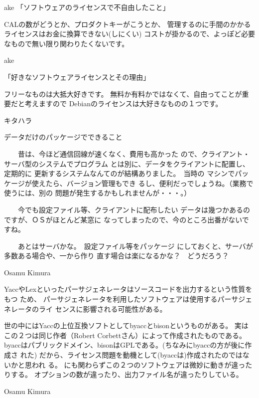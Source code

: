 \documentclass[cjk,dvipdfmx,12pt]{beamer}
\begin{document}
\begin{frame}{ake}
「ソフトウェアのライセンスで不自由したこと」

CALの数がどうとか、プロダクトキーがこうとか、
管理するのに手間のかかるライセンスはお金に換算できない(しにくい)
コストが掛かるので、よっぽど必要なもので無い限り関わりたくないです。
\end{frame}\begin{frame}{ake}

「好きなソフトウェアライセンスとその理由」

フリーなものは大抵大好きです。
無料か有料かではなくて、自由ってことが重要だと考えますので
Debianのライセンスは大好きなものの１つです。

\end{frame}\begin{frame}{キタハラ}

データだけのパッケージでできること

　　昔は、今ほど通信回線が速くなく、費用も高かった
ので、クライアント・サーバ型のシステムでプログラム
とは別に、データをクライアントに配置し、定期的に
更新するシステムなんてのが結構ありました。　当時の
マシンでパッケージが使えたら、バージョン管理もでき
るし、便利だっでしょうね。（業務で使うには、別の
問題が発生するかもしれませんが・・・。）

　　今でも設定ファイル等、クライアントに配布したい
データは幾つかあるのですが、ＯＳがほとんど某窓に
なってしまったので、今のところ出番がないですね。

　　あとはサーバかな。　設定ファイル等をパッケージ
にしておくと、サーバが多数ある場合や、一から作り
直す場合は楽になるかな？　どうだろう？


\end{frame}\begin{frame}{Osamu Kimura}

YaccやLexといったパーサジェネレータはソースコードを出力するという性質をもつ
ため、
パーサジェネレータを利用したソフトウェアは使用するパーサジェネレータのライ
センスに影響される可能性がある。

世の中にはYaccの上位互換ソフトとしてbyaccとbisonというものがある。
実はこの２つは同じ作者（Robert Corbettさん）によって作成されたものである。
byaccはパブリックドメイン、bisonはGPLである。(ちなみにbyaccの方が後に作成さ
れた)
だから、ライセンス問題を動機として(byaccは)作成されたのではないかと思われ
る。
にも関わらずこの２つのソフトウェアは微妙に動きが違ったりする。
オプションの数が違ったり、出力ファイル名が違ったりしている。

\end{frame}\begin{frame}{Osamu Kimura}


\end{frame}
\end{document}
